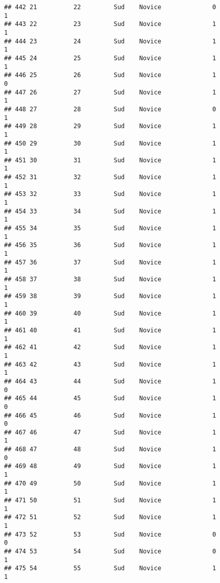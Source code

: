 \documentclass[
]{article}
\begin{document}
\begin{verbatim}
## 442 21          22         Sud    Novice              0                 1
## 443 22          23         Sud    Novice              1                 1
## 444 23          24         Sud    Novice              1                 1
## 445 24          25         Sud    Novice              1                 1
## 446 25          26         Sud    Novice              1                 0
## 447 26          27         Sud    Novice              1                 1
## 448 27          28         Sud    Novice              0                 1
## 449 28          29         Sud    Novice              1                 1
## 450 29          30         Sud    Novice              1                 1
## 451 30          31         Sud    Novice              1                 1
## 452 31          32         Sud    Novice              1                 1
## 453 32          33         Sud    Novice              1                 1
## 454 33          34         Sud    Novice              1                 1
## 455 34          35         Sud    Novice              1                 1
## 456 35          36         Sud    Novice              1                 1
## 457 36          37         Sud    Novice              1                 1
## 458 37          38         Sud    Novice              1                 1
## 459 38          39         Sud    Novice              1                 1
## 460 39          40         Sud    Novice              1                 1
## 461 40          41         Sud    Novice              1                 1
## 462 41          42         Sud    Novice              1                 1
## 463 42          43         Sud    Novice              1                 1
## 464 43          44         Sud    Novice              1                 0
## 465 44          45         Sud    Novice              1                 0
## 466 45          46         Sud    Novice              1                 0
## 467 46          47         Sud    Novice              1                 1
## 468 47          48         Sud    Novice              1                 0
## 469 48          49         Sud    Novice              1                 1
## 470 49          50         Sud    Novice              1                 1
## 471 50          51         Sud    Novice              1                 1
## 472 51          52         Sud    Novice              1                 1
## 473 52          53         Sud    Novice              0                 0
## 474 53          54         Sud    Novice              0                 1
## 475 54          55         Sud    Novice              1                 1

\end{verbatim}
\end{document}
